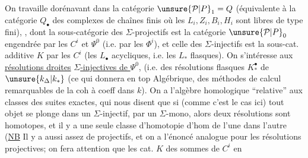 On travaille dorénavant dans la catégorie $\unsure{\mathcal P|P}_1=Q$ (équivalente à la catégorie $Q_\bullet$ des complexes de chaînes finis où les $L_i,Z_i,B_i,H_i$ sont libres de type fini), , dont la sous-catégorie des $\Sigma$-projectifs est  la catégorie  $\unsure{\mathcal P|P}_0$ engendrée par les $C^i$ et $\Psi^0$ (i.e. par les $\Phi^i$), et celle des $\Sigma$-injectifs est la sous-cat. additive $K$   par les $C^i$ (les $L_\bullet$  acycliques, i.e. les $L_*$ flasques\unsure{\ldots}). On s'intéresse aux \uline{résolutions droites}  \uline{$\Sigma$-injectives de $\Psi^0$}, (i.e. des résolutions flasques $K_*^\bullet$ de $\unsure{k_\Delta|k_*}$ \inserted{$\unsure{\Psi}$} \unsure{---} (ce qui donnera  en top Algébrique, des méthodes de calcul remarquables de la coh à coeff dans $k$). On a l'algèbre homologique ``relative'' aux classes des suites exactes, qui nous disent que si (comme c'est le cas ici) tout objet  se plonge dans un $\Sigma$-injectif,  par un $\Sigma$-mono, alors  deux résolutions sont homotopes, et il y a une seule classe d'homotopie d'hom de l'une dans l'autre (\uline{NB} Il y a aussi assez de projectifs, et on a l'énoncé analogue pour les résolutions projectives; on fera attention que les cat. $K$ des sommes de $C^i$ en

